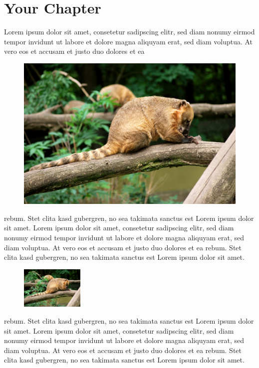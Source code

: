 \documentclass[a4paper]{scrreprt}
\begin{document}
\chapter{Your Chapter}
Lorem ipsum dolor sit amet, consetetur sadipscing elitr, sed diam 
nonumy eirmod tempor invidunt ut labore et dolore magna aliquyam 
erat, sed diam voluptua. At vero eos et accusam et justo duo dolores 
et ea 
\begin{figure}[h]
    \centering
    \includegraphics*[width=\linewidth]{YourImage.jpg} 
\end{figure}
rebum. Stet clita kasd gubergren, no sea takimata sanctus est Lorem 
ipsum dolor sit amet. Lorem ipsum dolor sit amet, consetetur 
sadipscing elitr, sed diam nonumy eirmod tempor invidunt ut labore et
dolore magna aliquyam erat, sed diam voluptua. At vero eos et accusam
et justo duo dolores et ea rebum. Stet clita kasd gubergren, no sea 
takimata sanctus est Lorem ipsum dolor sit amet.
\begin{figure}[h]
    \centering
    \includegraphics*[width=3cm]{YourImage.jpg} 
\end{figure}
rebum. Stet clita kasd gubergren, no sea takimata sanctus est Lorem 
ipsum dolor sit amet. Lorem ipsum dolor sit amet, consetetur 
sadipscing elitr, sed diam nonumy eirmod tempor invidunt ut labore et
dolore magna aliquyam erat, sed diam voluptua. At vero eos et accusam
et justo duo dolores et ea rebum. Stet clita kasd gubergren, no sea 
takimata sanctus est Lorem ipsum dolor sit amet.
\end{document}
